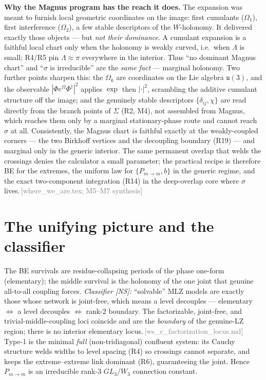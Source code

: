\documentclass[aps,prd,reprint,nofootinbib]{revtex4-2}
\newcommand{\pnote}[1]{\textcolor{gray}{\footnotesize\,[#1]}}
\newcommand{\Pmid}{P_{m\to m}}   %
\begin{document}
\textbf{Why the Magnus program has the reach it does.} The expansion was meant to furnish local geometric
coordinates on the image: first cumulants ($\Omega_1$), first interference ($\Omega_2$), a few stable
descriptors of the $W$-holonomy. It delivered exactly those objects --- but \emph{not their dominance}. A
cumulant expansion is a faithful local chart only when the holonomy is weakly curved, i.e.\ when $\Lambda$
is small; R4/R5 pin $\Lambda\approx\pi$ everywhere in the interior. Thus ``no dominant Magnus chart'' and
``$\sigma$ is irreducible'' are the \emph{same fact} --- marginal holonomy. Two further points sharpen this:
the $\Omega_k$ are coordinates on the Lie algebra $\mathfrak{u}(3)$, and the observable
$|\Phi e^{\Omega}\Phi^\dagger|^2$ applies $\exp$ then $|\cdot|^2$, scrambling the additive cumulant structure
off the image; and the genuinely stable descriptors $\{\delta_{ij},\chi\}$ are read directly from the branch
points of $\Sigma$ (R2, M4), not assembled from Magnus, which reaches them only by a marginal stationary-phase
route and cannot reach $\sigma$ at all. Consistently, the Magnus chart \emph{is} faithful exactly at the
weakly-coupled corners --- the two Birkhoff vertices and the decoupling boundary (R19) --- and marginal only
in the generic interior. The same permanent overlap that welds the crossings denies the calculator a small
parameter; the practical recipe is therefore BE for the extremes, the uniform law for $\{\Pmid,b\}$ in the
generic regime, and the exact two-component integration (R14) in the deep-overlap core where $\sigma$
lives.\pnote{where\_we\_are.tex; M5--M7 synthesis}

\section{The unifying picture and the classifier}
The BE survivals are residue-collapsing periods of the phase one-form (elementary); the middle
survival is the holonomy of the one joint that genuine all-to-all coupling forces. \emph{Classifier
[NS]:} ``solvable'' MLZ models are exactly those whose network is joint-free, which means a level
decouples --- elementary $\Leftrightarrow$ a level decouples $\Leftrightarrow$ rank-2 boundary. The
factorizable, joint-free, and trivial-middle-coupling loci coincide and are the \emph{boundary} of
the genuine-LZ region; there is no interior elementary locus.\pnote{ws\_c\_factorization\_locus.md}
Type-1 is the minimal \emph{full} (non-tridiagonal) confluent system: its Cauchy structure welds
widths to level spacing (R4) so crossings cannot separate, and keeps the extreme--extreme link
dominant (R6), guaranteeing the joint. Hence $\Pmid$ is an irreducible rank-3 $GL_3$/$W_3$ connection
constant.
\end{document}
